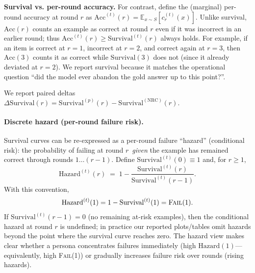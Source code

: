 \documentclass[11pt]{article}
\newcommand{\FailAt}[1]{\textsc{Fail}(#1)}
\begin{document}
\textbf{Survival vs. per-round accuracy.}
For contrast, define the (marginal) per-round accuracy at round $r$ as
\(\mathrm{Acc}^{(t)}(r) = \mathbb{E}_{x\sim S}[c^{(t)}_{r}(x)]\).
Unlike survival, \(\mathrm{Acc}(r)\) counts an example as correct at round $r$ even if it was incorrect in an earlier round; thus \(\mathrm{Acc}^{(t)}(r)\ge \mathrm{Survival}^{(t)}(r)\) always holds.
For example, if an item is correct at $r{=}1$, incorrect at $r{=}2$, and correct again at $r{=}3$, then \(\mathrm{Acc}(3)\) counts it as correct while \(\mathrm{Survival}(3)\) does not (since it already deviated at $r{=}2$).
We report survival because it matches the operational question ``did the model ever abandon the gold answer up to this point?''.

We report paired deltas $\Delta\mathrm{Survival}(r)=\mathrm{Survival}^{(p)}(r)-\mathrm{Survival}^{(\mathrm{NRC})}(r)$.

\paragraph{Discrete hazard (per-round failure risk).}
Survival curves can be re-expressed as a per-round failure ``hazard'' (conditional risk): the probability of failing at round $r$ \,\emph{given} the example has remained correct through rounds $1\ldots (r{-}1)$. Define $\mathrm{Survival}^{(t)}(0)\equiv 1$ and, for $r\ge 1$,
\begin{equation}
\mathrm{Hazard}^{(t)}(r)
\;=\; 1-\frac{\mathrm{Survival}^{(t)}(r)}{\mathrm{Survival}^{(t)}(r-1)}.
\end{equation}
With this convention,
\begin{equation}
\mathrm{Hazard}^{(t)}(1) = 1-\mathrm{Survival}^{(t)}(1) = \FailAt{1}.
\end{equation}
If $\mathrm{Survival}^{(t)}(r-1)=0$ (no remaining at-risk examples), then the conditional hazard at round $r$ is undefined; in practice our reported plots/tables omit hazards beyond the point where the survival curve reaches zero.
The hazard view makes clear whether a persona concentrates failures immediately (high \(\mathrm{Hazard}(1)\)---equivalently, high \FailAt{1}) or gradually increases failure risk over rounds (rising hazards).
\end{document}
